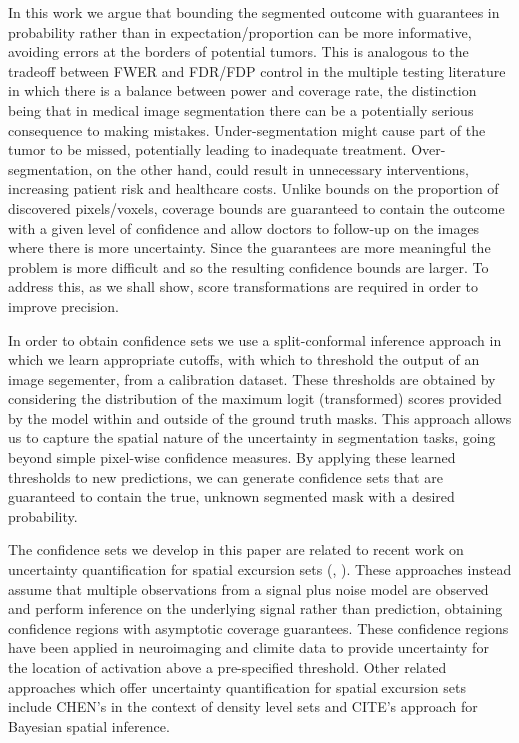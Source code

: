 In this work we argue that bounding the segmented outcome with guarantees in probability rather than in expectation/proportion can be more informative, avoiding errors at the borders of potential tumors. This is analogous to the tradeoff between FWER and FDR/FDP control in the multiple testing literature in which there is a balance between power and coverage rate, the distinction being that in medical image segmentation there can be a potentially serious consequence to making mistakes. Under-segmentation might cause part of the tumor to be missed, potentially leading to inadequate treatment. Over-segmentation, on the other hand, could result in unnecessary interventions, increasing patient risk and healthcare costs. Unlike bounds on the proportion of discovered pixels/voxels, coverage bounds are guaranteed to contain the outcome with a given level of confidence and allow doctors to follow-up on the images where there is more uncertainty. Since the guarantees are more meaningful the problem is more difficult and so the resulting confidence bounds are larger. To address this, as we shall show, score transformations are required in order to improve precision. 

In order to obtain confidence sets we use a split-conformal inference approach in which we learn appropriate cutoffs, with which to threshold the output of an image segementer, from a calibration dataset. These thresholds are obtained by considering the distribution of the maximum logit (transformed) scores provided by the model within and outside of the ground truth masks. This approach allows us to capture the spatial nature of the uncertainty in segmentation tasks, going beyond simple pixel-wise confidence measures. By applying these learned thresholds to new predictions, we can generate confidence sets that are guaranteed to contain the true, unknown segmented mask with a desired probability. 

The confidence sets we develop in this paper are related to recent work on uncertainty quantification for spatial excursion sets (\cite{Sommerfield2018}, \cite{Telschow2023scope}). These approaches instead assume that multiple observations from a signal plus noise model are observed and perform inference on the underlying signal rather than prediction, obtaining confidence regions with asymptotic coverage guarantees. These confidence regions have been applied in neuroimaging \citep{Bowring2019, Bowring2020} and climite data \cite{Ren} to provide uncertainty for the location of activation above a pre-specified threshold. Other related approaches which offer uncertainty quantification for spatial excursion sets include CHEN's in the context of density level sets and CITE's approach for Bayesian spatial inference.


